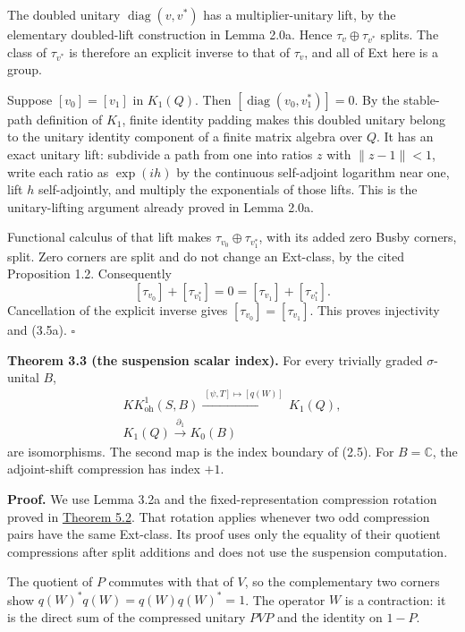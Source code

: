 \documentclass[
  11pt,
]{article}
\begin{document}
The doubled unitary \(\operatorname{diag}(v,v^*)\) has a
multiplier-unitary lift, by the elementary doubled-lift construction in
Lemma 2.0a. Hence \(\tau_v\oplus\tau_{v^*}\) splits. The class of
\(\tau_{v^*}\) is therefore an explicit inverse to that of \(\tau_v\),
and all of Ext here is a group.

Suppose \([v_0]=[v_1]\) in \(K_1(Q)\). Then
\([\operatorname{diag}(v_0,v_1^*)]=0\). By the stable-path definition of
\(K_1\), finite identity padding makes this doubled unitary belong to
the unitary identity component of a finite matrix algebra over \(Q\). It
has an exact unitary lift: subdivide a path from one into ratios \(z\)
with \(\|z-1\|<1\), write each ratio as \(\exp(ih)\) by the continuous
self-adjoint logarithm near one, lift \(h\) self-adjointly, and multiply
the exponentials of those lifts. This is the unitary-lifting argument
already proved in Lemma 2.0a.

Functional calculus of that lift makes \(\tau_{v_0}\oplus\tau_{v_1^*}\),
with its added zero Busby corners, split. Zero corners are split and do
not change an Ext-class, by the cited Proposition 1.2. Consequently \[
[\tau_{v_0}]+[\tau_{v_1^*}]=0
=[\tau_{v_1}]+[\tau_{v_1^*}].
\] Cancellation of the explicit inverse gives
\([\tau_{v_0}]=[\tau_{v_1}]\). This proves injectivity and (3.5a).
\(\square\)

\textbf{Theorem 3.3 (the suspension scalar index).} For every trivially
graded \(\sigma\)-unital \(B\), \[
\begin{gathered}
KK_{\mathrm{oh}}^1(S,B)
\xrightarrow{\ [\psi,T]\mapsto[q(W)]\ }K_1(Q),\\
K_1(Q)\xrightarrow{\ \partial_1\ }K_0(B)
\end{gathered}
\tag{3.6}
\] are isomorphisms. The second map is the index boundary of (2.5). For
\(B=\mathbb C\), the adjoint-shift compression has index \(+1\).

\textbf{Proof.} We use Lemma 3.2a and the fixed-representation
compression rotation proved in
\hyperref[odd-compression-and-the-extension-it-defines]{Theorem 5.2}.
That rotation applies whenever two odd compression pairs have the same
Ext-class. Its proof uses only the equality of their quotient
compressions after split additions and does not use the suspension
computation.

The quotient of \(P\) commutes with that of \(V\), so the complementary
two corners show \(q(W)^*q(W)=q(W)q(W)^*=1\). The operator \(W\) is a
contraction: it is the direct sum of the compressed unitary \(PVP\) and
the identity on \(1-P\).
\end{document}
